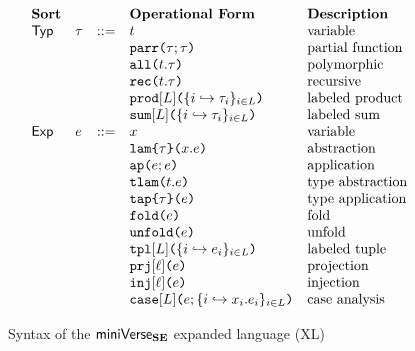 \begin{figure}
\[\begin{array}{lllllll}
\textbf{Sort} & & & \textbf{Operational Form} %
& \textbf{Description}\\
\mathsf{Typ} 
& \tau & ::= & t 
& \text{variable}\\
&&& \aparr{\tau}{\tau} 
& \text{partial function}\\
&&& \aall{t}{\tau} 
& \text{polymorphic}\\
&&& \arec{t}{\tau} 
& \text{recursive}\\
&&& \aprod{\labelset}{\mapschema{\tau}{i}{\labelset}} 
& \text{labeled product}\\
&&& \asum{\labelset}{\mapschema{\tau}{i}{\labelset}} 
& \text{labeled sum}\\
\mathsf{Exp} & e & ::= & x 
& \text{variable}\\
&&& \aelam{\tau}{x}{e} 
& \text{abstraction}\\
&&& \aeap{e}{e} 
& \text{application}\\
&&& \aetlam{t}{e} 
& \text{type abstraction}\\
&&& \aetap{e}{\tau} 
& \text{type application}\\
&&& \aefold{e} 
& \text{fold}\\
&&& \aeunfold{e} 
& \text{unfold}\\
&&& \aetpl{\labelset}{\mapschema{e}{i}{\labelset}} 
& \text{labeled tuple}\\
&&& \aepr{\ell}{e} 
& \text{projection}\\
&&& \aein{\ell}{e} 
& \text{injection}\\
&&& \aecase{\labelset}{e}{\mapschemab{x}{e}{i}{\labelset}} 
& \text{case analysis}
\end{array}\]
\caption[Syntax of the $\miniVerseUE$ expanded language (XL)]{Syntax of the $\miniVerseUE$ expanded language (XL)%
}
\label{fig:U-expanded-terms}
\end{figure}

